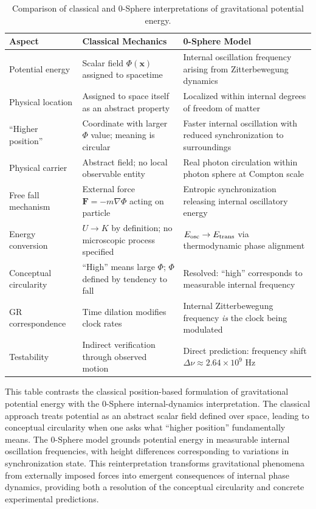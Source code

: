 \documentclass[%
 reprint,
 amsmath,amssymb,
 aps,
 prb,
]{revtex4-2}
\numberwithin{equation}{section}
\begin{document}
\begin{table}[t!]
\centering
\caption{Comparison of classical and 0-Sphere interpretations of gravitational potential energy.}
\label{tab:comparison}
\renewcommand{\arraystretch}{1.4}
\begin{tabular}{p{4.0cm}p{5.5cm}p{6.0cm}}
\toprule
\textbf{Aspect} & \textbf{Classical Mechanics} & \textbf{0-Sphere Model} \\
\midrule
Potential energy
& Scalar field $\Phi(\mathbf{x})$ assigned to spacetime
& Internal oscillation frequency arising from Zitterbewegung dynamics \\
\addlinespace[0.25cm]
Physical location
& Assigned to space itself as an abstract property
& Localized within internal degrees of freedom of matter \\
\addlinespace[0.25cm]
``Higher position''
& Coordinate with larger $\Phi$ value; meaning is circular
& Faster internal oscillation with reduced synchronization to surroundings \\
\addlinespace[0.25cm]
Physical carrier
& Abstract field; no local observable entity
& Real photon circulation within photon sphere at Compton scale \\
\addlinespace[0.25cm]
Free fall mechanism
& External force $\mathbf{F} = -m\nabla\Phi$ acting on particle
& Entropic synchronization releasing internal oscillatory energy \\
\addlinespace[0.25cm]
Energy conversion
& $U \to K$ by definition; no microscopic process specified
& $E_{\rm osc} \to E_{\rm trans}$ via thermodynamic phase alignment \\
\addlinespace[0.25cm]
Conceptual circularity
& ``High'' means large $\Phi$; $\Phi$ defined by tendency to fall
& Resolved: ``high'' corresponds to measurable internal frequency \\
\addlinespace[0.25cm]
GR correspondence
& Time dilation modifies clock rates
& Internal Zitterbewegung frequency \emph{is} the clock being modulated \\
\addlinespace[0.25cm]
Testability
& Indirect verification through observed motion
& Direct prediction: frequency shift $\Delta\nu \approx 2.64 \times 10^9$ Hz \\
\bottomrule
\end{tabular}
\vspace{0.4em}
\begin{minipage}{0.95\textwidth}
\justifying\small
This table contrasts the classical position-based formulation of gravitational potential energy with the 0-Sphere internal-dynamics interpretation. The classical approach treats potential as an abstract scalar field defined over space, leading to conceptual circularity when one asks what ``higher position'' fundamentally means. The 0-Sphere model grounds potential energy in measurable internal oscillation frequencies, with height differences corresponding to variations in synchronization state. This reinterpretation transforms gravitational phenomena from externally imposed forces into emergent consequences of internal phase dynamics, providing both a resolution of the conceptual circularity and concrete experimental predictions.
\end{minipage}
\end{table}
\end{document}
